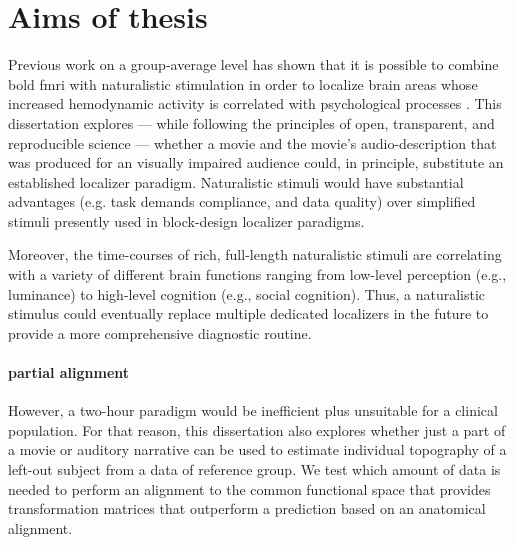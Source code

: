 

\section{Aims of thesis}



%
Previous work on a group-average level has shown that it is possible to combine
\ac{bold} \ac{fmri} with naturalistic stimulation in order to localize brain
areas whose increased hemodynamic activity is correlated with psychological
processes \citep{bartels2004mapping}.
%
This dissertation explores --- while following the principles of open,
transparent, and reproducible science --- whether a movie and the movie's
audio-description that was produced for an visually impaired audience could, in
principle, substitute an established localizer paradigm.
%
Naturalistic stimuli would have substantial advantages (e.g. task demands
compliance, and data quality) over simplified stimuli presently used in
block-design localizer paradigms.


%
Moreover, the time-courses of rich, full-length naturalistic stimuli are
correlating with a variety of different brain functions ranging from low-level
perception (e.g., luminance) to high-level cognition (e.g., social cognition).
%
Thus, a naturalistic stimulus could eventually replace multiple dedicated
localizers in the future to provide a more comprehensive diagnostic routine.

\paragraph{partial alignment}
%
However, a two-hour paradigm would be inefficient plus unsuitable for a clinical
population.
%
For that reason, this dissertation also explores whether just a part of a movie
or auditory narrative can be used to estimate individual topography of a
left-out subject from a data of reference group.
%
We test which amount of data is needed to perform an alignment
to the common functional space that provides transformation matrices that
outperform a prediction based on an anatomical alignment.


